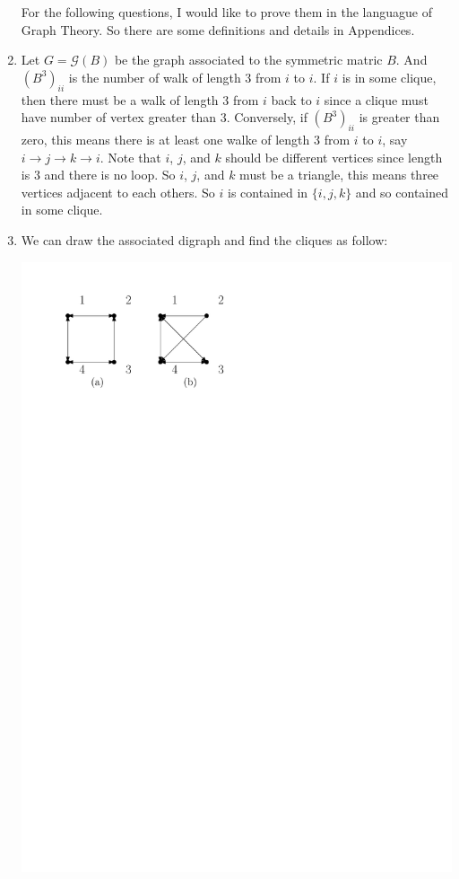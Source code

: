 \begin{enumerate}
For the following questions, I would like to prove them in the languague of Graph Theory. So there are some definitions and details in Appendices.
\item Let $G=\mathcal{G}(B)$ be the graph associated to the symmetric matric $B$. And $(B^3)_{ii}$ is the number of walk of length $3$ from $i$ to $i$. If $i$ is in some clique, then there must be a walk of length $3$ from $i$ back to $i$ since a clique must have number of vertex greater than $3$. Conversely, if $(B^3)_{ii}$ is greater than zero, this means there is at least one walke of length $3$ from $i$ to $i$, say $i\rightarrow j\rightarrow k\rightarrow i$. Note that $i$, $j$, and $k$ should be different vertices since length is $3$ and there is no loop. So $i$, $j$, and $k$ must be a triangle, this means three vertices adjacent to each others. So $i$ is contained in $\{i,j,k\}$ and so contained in some clique.
\item We can draw the associated digraph and find the cliques as follow:
\begin{center}
\includegraphics[scale=0.7]{2-4-20}

\end{center}
\end{enumerate}
